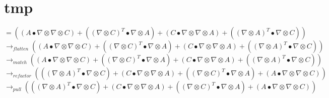 \documentclass{article}
\begin{document}
\section{tmp}
$= ((A \bullet  \nabla  \otimes  \nabla  \otimes C)+(( \nabla  \otimes C)^T \bullet  \nabla  \otimes A)+(C \bullet  \nabla  \otimes  \nabla  \otimes A)+(( \nabla  \otimes A)^T \bullet  \nabla  \otimes C))$
 \\
\newline $\rightarrow_{flatten}((A \bullet  \nabla  \otimes  \nabla  \otimes C)+(( \nabla  \otimes C)^T \bullet  \nabla  \otimes A)+(C \bullet  \nabla  \otimes  \nabla  \otimes A)+(( \nabla  \otimes A)^T \bullet  \nabla  \otimes C))$\\
\newline $\rightarrow_{match}((A \bullet  \nabla  \otimes  \nabla  \otimes C)+(( \nabla  \otimes C)^T \bullet  \nabla  \otimes A)+(C \bullet  \nabla  \otimes  \nabla  \otimes A)+(( \nabla  \otimes A)^T \bullet  \nabla  \otimes C))$\\
\newline $\rightarrow_{refactor}((( \nabla  \otimes A)^T \bullet  \nabla  \otimes C)+(C \bullet  \nabla  \otimes  \nabla  \otimes A)+(( \nabla  \otimes C)^T \bullet  \nabla  \otimes A)+(A \bullet  \nabla  \otimes  \nabla  \otimes C))$\\
\newline $\rightarrow_{pull}((( \nabla  \otimes A)^T \bullet  \nabla  \otimes C)+(C \bullet  \nabla  \otimes  \nabla  \otimes A)+(( \nabla  \otimes C)^T \bullet  \nabla  \otimes A)+(A \bullet  \nabla  \otimes  \nabla  \otimes C))$
\end{document}

